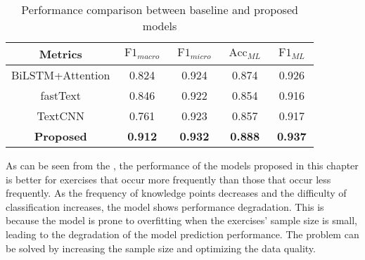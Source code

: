 \begin{table}[htbp!]
    \caption{Performance comparison between baseline and proposed models}\label{tbl:ch2-result-bsline1}
    \centering
    \begin{tabular}{ccccc}
        \toprule
        Metrics           & \(\operatorname{F1}_{macro}\) & \(\operatorname{F1}_{micro}\) & \(\operatorname{Acc}_{ML}\) & \(\operatorname{F1}_{ML}\) \\
        \midrule
        BiLSTM+Attention  & 0.824                         & 0.924                         & 0.874                       & 0.926                      \\
        fastText          & 0.846                         & 0.922                         & 0.854                       & 0.916                      \\
        TextCNN           & 0.761                         & 0.923                         & 0.857                       & 0.917                      \\
        \textbf{Proposed} & \textbf{0.912}                & \textbf{0.932}                & \textbf{0.888}              & \textbf{0.937}             \\
        \bottomrule
    \end{tabular}
\end{table}

As can be seen from the \tblname{\ref{tbl:ch2-result-detail}}, the performance of the models proposed in this chapter is better for exercises that occur more frequently than those that occur less frequently. As the frequency of knowledge points decreases and the difficulty of classification increases, the model shows performance degradation. This is because the model is prone to overfitting when the exercises' sample size is small, leading to the degradation of the model prediction performance. The problem can be solved by increasing the sample size and optimizing the data quality.

